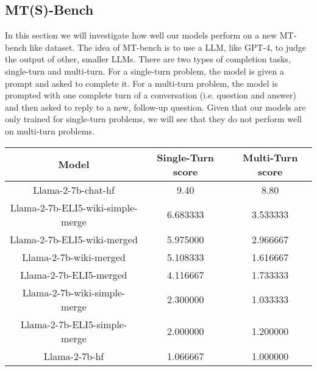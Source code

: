\documentclass[11pt, oneside]{article}   	%
\begin{document}
\subsection{MT(S)-Bench}

In this section we will investigate how well our models perform on a new MT-bench like dataset.
The idea of MT-bench is to use a LLM, like GPT-4, to judge the output of other, smaller LLMs. 
There are two types of completion tasks, single-turn and multi-turn.
For a single-turn problem, the model is given a prompt and asked to complete it.
For a multi-turn problem, the model is prompted with one complete turn of a conversation (i.e. question and answer) and then asked to reply to a new, follow-up question. 
Given that our models are only trained for single-turn problems, we will see that they do not perform well on multi-turn problems.


\begin{center}
\begin{tabular}{c|c|c}
    \hline
    \textbf{Model} & \textbf{Single-Turn score}& \textbf{Multi-Turn score} \\
    \hline
    Llama-2-7b-chat-hf &  9.40 & 8.80\\ 
    Llama-2-7b-ELI5-wiki-simple-merge & 6.683333 & 3.533333  \\
    Llama-2-7b-ELI5-wiki-merged &  5.975000 &  2.966667 \\
    Llama-2-7b-wiki-merged &  5.108333 & 1.616667  \\
    Llama-2-7b-ELI5-merged &  4.116667 & 1.733333  \\
    Llama-2-7b-wiki-simple-merge &  2.300000& 1.033333  \\
    Llama-2-7b-ELI5-simple-merge & 2.000000 & 1.200000  \\
    Llama-2-7b-hf & 1.066667 &1.000000 \\
    \hline
\end{tabular}
\end{center}
\end{document}

